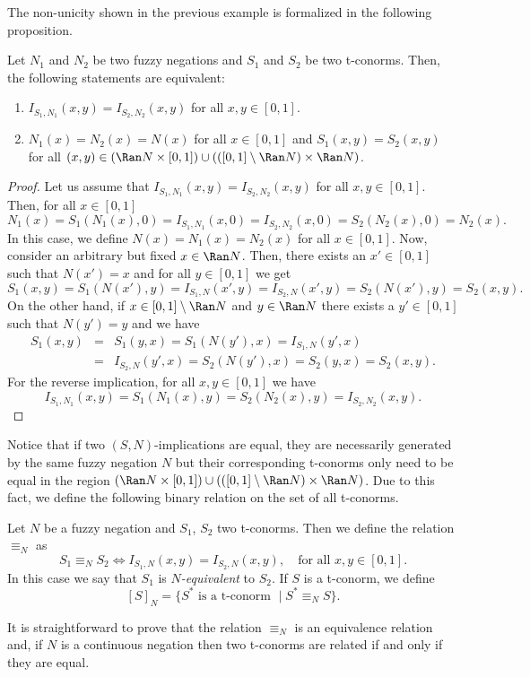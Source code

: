 The non-unicity shown in the previous example is formalized in the following proposition.
\begin{proposition}\label{prop:non-unicity}
	Let $N_1$ and $N_2$ be two fuzzy negations and $S_1$ and $S_2$ be two t-conorms. Then, the following statements are equivalent:
	\begin{enumerate}[label=(\roman*)]
		\item $I_{S_1,N_1}(x,y)=I_{S_2,N_2}(x,y)$ for all $x,y \in [0,1]$.
		\item $N_1(x)=N_2(x)=N(x)$ for all $x \in [0,1]$ and $S_1(x,y)=S_2(x,y)$ for all $(x,y) \in (\Ran N \times [0,1]) \cup (([0,1] \setminus \Ran N) \times \Ran N)$.
	\end{enumerate}
\end{proposition}
\begin{proof}
	Let us assume that $I_{S_1,N_1}(x,y)=I_{S_2,N_2}(x,y)$ for all $x,y \in [0,1]$. Then, for all $x\in[0,1]$ $$N_1(x)=S_1(N_1(x),0)=I_{S_1,N_1}(x,0)=I_{S_2,N_2}(x,0)=S_2(N_2(x),0)=N_2(x).$$	
	In this case, we define $N(x)=N_1(x)=N_2(x)$ for all $x \in [0,1]$. Now, consider an arbitrary but fixed $x \in \Ran N$. Then, there exists an $x' \in [0,1]$ such that $N(x')=x$ and for all $y \in [0,1]$ we get
	$$S_1(x,y)=S_1(N(x'),y)=I_{S_1,N}(x',y)=I_{S_2,N}(x',y)=S_2(N(x'),y)=S_2(x,y).$$
	On the other hand, if $x \in [0,1] \setminus \Ran N$ and $ y \in \Ran N$ there exists a $y' \in [0,1]$ such that $N(y')=y$ and we have
	\begin{eqnarray*}
	S_1(x,y) &=&S_1(y,x)=S_1(N(y'),x)=I_{S_1,N}(y',x)\\
	&=&I_{S_2,N}(y',x)=S_2(N(y'),x)=S_2(y,x)=S_2(x,y).
	\end{eqnarray*}
	For the reverse implication, for all $x,y \in [0,1]$ we have
	$$I_{S_1,N_1}(x,y)=S_1(N_1(x),y)=S_2(N_2(x),y)=I_{S_2,N_2}(x,y).$$
\end{proof}
Notice that if two $(S,N)$-implications are equal, they are necessarily generated by the same fuzzy negation $N$ but their corresponding t-conorms only need to be equal in the region $(\Ran N \times [0,1]) \cup (([0,1] \setminus \Ran N) \times \Ran N)$. Due to this fact, we define the following binary relation on the set of all t-conorms.
\begin{definition} Let $N$ be a fuzzy negation and $S_1$, $S_2$ two t-conorms. Then we define the relation $\equiv_N$ as	
	$$S_1 \equiv_N S_2 \Leftrightarrow I_{S_1,N}(x,y)=I_{S_2,N}(x,y), \quad \text{for all } x,y \in [0,1].$$
	In this case we say that $S_1$ is \emph{$N$-equivalent} to $S_2$. If $S$ is a t-conorm, we define
	$$[S]_N = \{S^* \text{ is a t-conorm } \mid S^* \equiv_N S\}.$$
\end{definition}
It is straightforward to prove that the relation $\equiv_N$ is an equivalence relation and, if $N$ is a continuous negation then two t-conorms are related if and only if they are equal.

